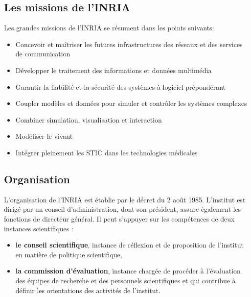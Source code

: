 \documentclass[a4paper, 11pt]{report}
\begin{document}
    \subsection{Les missions de l'INRIA}
    Les grandes missions de l'INRIA se résument dans les points suivants:
    \begin{itemize}
     \item Concevoir et maîtriser les futures infrastructures des réseaux et
     des services de communication
     \item Développer le traitement des informations et données multimédia
     \item Garantir la fiabilité et la sécurité des systèmes à logiciel
     prépondérant
     \item Coupler modèles et données pour simuler et contrôler les systèmes
     complexes
     \item Combiner simulation, visualisation et interaction
     \item Modéliser le vivant
     \item Intégrer pleinement les STIC dans les technologies médicales
    \end{itemize}
    \subsection{Organisation}
    L'organisation de l'INRIA est établie par le décret du 2 août 1985.
    L'institut est dirigé par un conseil d'administration, dont son
    président, assure également les fonctions de directeur général.
    Il peut s'appuyer sur les compétences de deux instances scientifiques :
    \begin{itemize}
      \item \textbf{le conseil scientifique}, instance de réflexion et de
      proposition de l'institut en matière de politique scientifique,
      \item \textbf{la commission d’évaluation}, instance chargée de procéder à
      l'évaluation des équipes de recherche et des personnels scientifiques
      et qui contribue à définir les orientations des activités de l'institut.
    \end{itemize}
\end{document}
